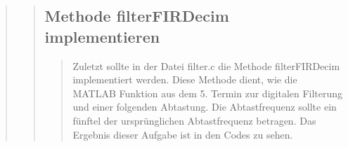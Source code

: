 \begin{quote}
\begin{quote}
\begin{quote}
		\end{quote}
		
		\subsection{Methode filterFIRDecim implementieren}
		\begin{quote}
		
		Zuletzt sollte in der Datei filter.c die Methode filterFIRDecim implementiert
		werden. Diese Methode dient, wie die MATLAB Funktion aus dem 5. Termin zur
		digitalen Filterung und einer folgenden Abtastung. Die Abtastfrequenz sollte
		ein fünftel der ursprünglichen Abtastfrequenz betragen. Das Ergebnis dieser
		Aufgabe ist in den Codes zu sehen.
		
		\end{quote}
	
	\end{quote}%
\end{quote}%

